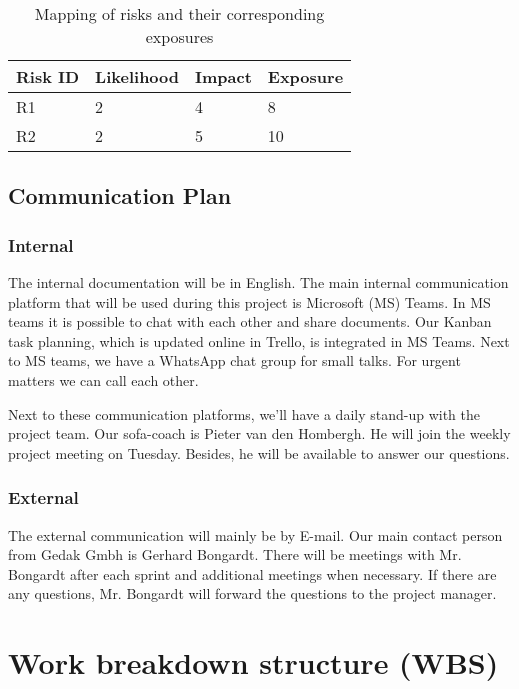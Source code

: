 \begin{table}[htp]
    \caption{Mapping of risks and their corresponding exposures}
    \center
    \begin{tabular}{@{}|l|l|l|l|@{}}
        \toprule
        \textbf{Risk ID} & \textbf{Likelihood} & \textbf{Impact} & \textbf{Exposure} \\
        \hline
        R1      & 2          & 4      & 8        \\
        R2      & 2          & 5      & 10 \\
        \hline
    \end{tabular}\label{tab:table4}
\end{table}

\subsection{Communication Plan}

\subsubsection{Internal}

The internal documentation will be in English.
The main internal communication platform that will be used during this project is Microsoft (MS) Teams.
In MS teams it is possible to chat with each other and share documents.
Our Kanban task planning, which is updated online in Trello, is integrated in MS Teams.
Next to MS teams, we have a WhatsApp chat group for small talks.
For urgent matters we can call each other.


Next to these communication platforms, we'll have a daily stand-up with the project team.
Our \ac{sofa}-coach is Pieter van den Hombergh.
He will join the weekly project meeting on Tuesday.
Besides, he will be available to answer our questions.

\subsubsection{External}

The external communication will mainly be by E-mail.
Our main contact person from Gedak Gmbh is Gerhard Bongardt.
There will be meetings with Mr. Bongardt after each sprint and additional meetings when necessary.
If there are any questions, Mr. Bongardt will forward the questions to the project manager.

\section{Work breakdown structure (WBS)}\label{sec:work-breakdown-structure-(wbs)}

